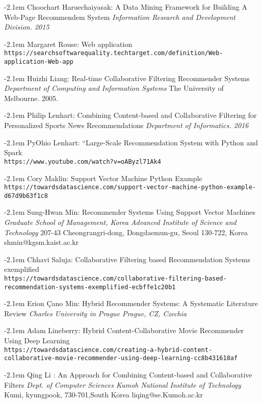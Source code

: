 \documentclass{itkmitlcoop}
\makeatletter
\def\bibindent{2.1em}
\let\old@bibitem\bibitem
\def\bibitem#1{\old@bibitem{#1}\leavevmode\kern-\bibindent}
\makeatother
\begin{document}
\begin{thebibliography}{9}
  Choochart Haruechaiyasak: A Data Mining Framework for Building A Web-Page Recommendem System
  \textit{Information Research and Development Division. 2015}

  Margaret Rouse: Web application
  \\\texttt{https://searchsoftwarequality.techtarget.com/definition/Web-application-Web-app}






  Huizhi Liang: Real-time Collaborative Filtering Recommender Systems
  \textit{Department of Computing and Information Systems}
  The University of Melbourne. 2005.

  Philip Lenhart: Combining Content-based and Collaborative Filtering for Personalized Sports News Recommendations
  \textit{Department of Informatics. 2016}

  PyOhio Lenhart: “Large-Scale Recommendation System with Python and Spark
  \\\texttt{https://www.youtube.com/watch?v=oAByzl71Ak4}

  Cory Maklin: Support Vector Machine Python Example
  \\\texttt{https://towardsdatascience.com/support-vector-machine-python-example-d67d9b63f1c8}

  Sung-Hwan Min: Recommender Systems Using Support Vector Machines 
  \textit{Graduate School of Management, Korea Advanced Institute of Science and Technology}
  207-43 Cheongrangri-dong, Dongdaemun-gu, Seoul 130-722, Korea shmin@kgsm.kaist.ac.kr 

  
  Chhavi Saluja: Collaborative Filtering based Recommendation Systems exemplified
  \\\texttt{https://towardsdatascience.com/collaborative-filtering-based-recommendation-systems-exemplified-ecbffe1c20b1}

  Erion Çano Min: Hybrid Recommender Systems: A Systematic Literature Review
  \textit{Charles University in Prague Prague, CZ, Czechia}

  Adam Lineberry: Hybrid Content-Collaborative Movie Recommender Using Deep Learning
  \\\texttt{https://towardsdatascience.com/creating-a-hybrid-content-collaborative-movie-recommender-using-deep-learning-cc8b431618af}

 
  Qing Li : An Approach for Combining Content-based and Collaborative Filters 
  \textit{Dept. of Computer Sciences Kumoh National Institute of Technology}
  Kumi, kyungpook, 730-701,South Korea liqing@se.Kumoh.ac.kr 


\end{thebibliography}
\end{document}
